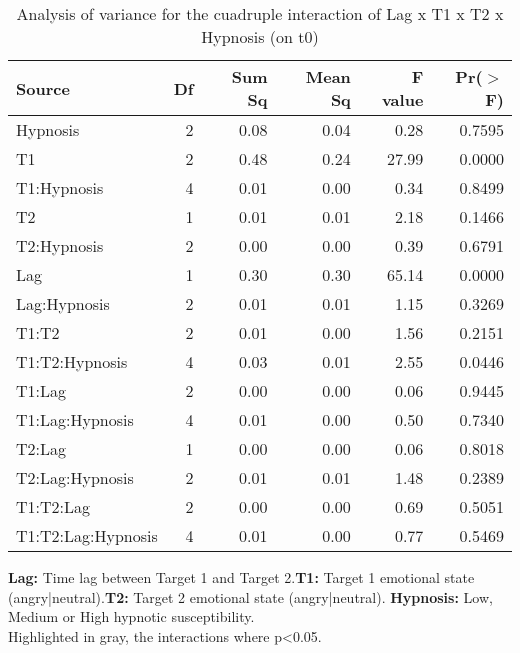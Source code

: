 \documentclass{article}
\begin{document}
%
\begin{table}
\caption{Analysis of variance for the cuadruple interaction of Lag x T1 x T2 x Hypnosis (on t0)}
\centering
\begin{tabular}{lrrrrr}
  \hline
Source & Df & Sum Sq & Mean Sq & F value & Pr($>$F) \\ 
  \hline
Hypnosis    & 2 & 0.08 & 0.04 & 0.28 & 0.7595 \\
\rowcolor{Gray}
  T1        & 2 & 0.48 & 0.24 & 27.99 & 0.0000 \\ 
  T1:Hypnosis & 4 & 0.01 & 0.00 & 0.34 & 0.8499 \\ 
  T2        & 1 & 0.01 & 0.01 & 2.18 & 0.1466 \\ 
  T2:Hypnosis & 2 & 0.00 & 0.00 & 0.39 & 0.6791 \\ 
  Lag        & 1 & 0.30 & 0.30 & 65.14 & 0.0000 \\ 
  Lag:Hypnosis & 2 & 0.01 & 0.01 & 1.15 & 0.3269 \\ 
  T1:T2        & 2 & 0.01 & 0.00 & 1.56 & 0.2151 \\ 
  T1:T2:Hypnosis & 4 & 0.03 & 0.01 & 2.55 & 0.0446 \\ 
  T1:Lag        & 2 & 0.00 & 0.00 & 0.06 & 0.9445 \\ 
  T1:Lag:Hypnosis & 4 & 0.01 & 0.00 & 0.50 & 0.7340 \\ 
  T2:Lag        & 1 & 0.00 & 0.00 & 0.06 & 0.8018 \\ 
  T2:Lag:Hypnosis & 2 & 0.01 & 0.01 & 1.48 & 0.2389 \\ 
  T1:T2:Lag        & 2 & 0.00 & 0.00 & 0.69 & 0.5051 \\ 
  T1:T2:Lag:Hypnosis & 4 & 0.01 & 0.00 & 0.77 & 0.5469 \\ 
   \hline
\end{tabular}
\end{table}

\textbf{Lag:} Time lag between Target 1 and Target 2.\textbf{T1:} Target 1 emotional state (angry|neutral).\textbf{T2:} Target 2 emotional state (angry|neutral). \textbf{Hypnosis:} Low, Medium or High hypnotic susceptibility.\\ Highlighted in gray, the interactions where p<0.05.
\end{document}
